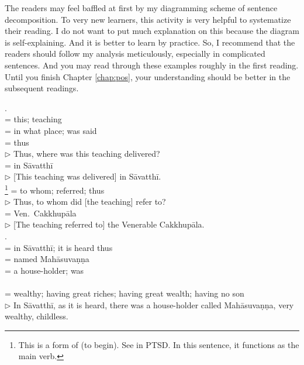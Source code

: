 The readers may feel baffled at first by my diagramming scheme of sentence decomposition. To very new learners, this activity is very helpful to systematize their reading. I do not want to put much explanation on this because the diagram is self-explaining. And it is better to learn by practice. So, I recommend that the readers should follow my analysis meticulously, especially in complicated sentences. And you may read through these examples roughly in the first reading. Until you finish Chapter \ref{chap:pos}, your understanding should be better in the subsequent readings.

\bigskip
\setcounter{sennum}{1}
. \\[1mm]
\small
{}  = this; teaching\\[0.5mm]
  = in what place; was said\\[0.5mm]
 = thus\\[1mm]
\normalsize
$\triangleright$ Thus, where was this teaching delivered?\\[1.5mm]
\small
{} = in S\=avatth\=i\\[1mm]
\normalsize
$\triangleright$ [This teaching was delivered] in S\=avatth\=i.\\[1.5mm]
\small
{} \footnote{This is a  form of  (to begin). See  in PTSD. In this sentence, it functions as the main verb.}  = to whom; referred; thus\\[1mm]
\normalsize
$\triangleright$ Thus, to whom did [the teaching] refer to?\\[1.5mm]
\small
{} = Ven.\ Cakkhup\=ala\\[1mm]
\normalsize
$\triangleright$ [The teaching referred to] the Venerable Cakkhup\=ala.\\[1.5mm]

\medskip
{}. \\[1mm]
\small
{}  = in S\=avatth\=i; it is heard thus\\[0.5mm]
 = named Mah\=asuva\d n\d na\\[0.5mm]
  = a house-holder; was\\[0.5mm]
\\[0.5mm]
= wealthy; having great riches; having great wealth; having no son\\[1mm]
\normalsize
$\triangleright$ In S\=avatth\=i, as it is heard, there was a house-holder called Mah\=asuva\d n\d na, very wealthy, childless.\\[1.5mm]

